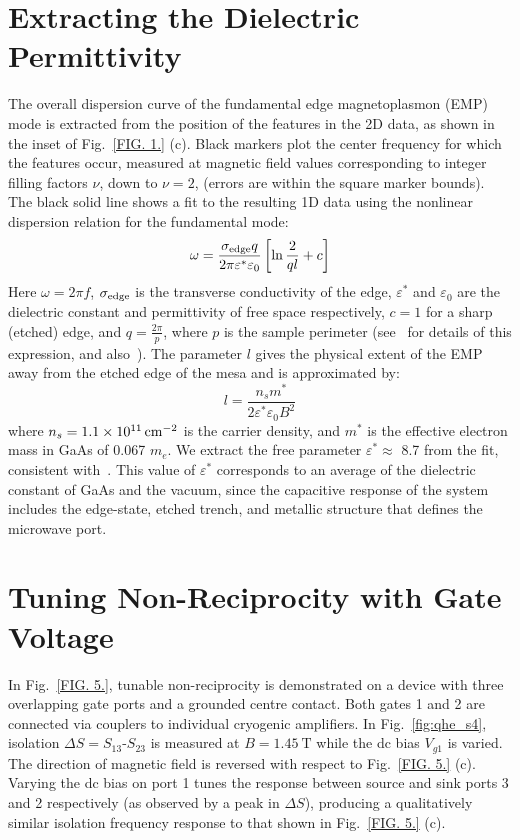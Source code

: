 \section{Extracting the Dielectric Permittivity}
\label{sec:qhe_di}
The overall dispersion curve of the fundamental edge magnetoplasmon (EMP) mode is extracted from the position of the features in the 2D data, as shown in the inset of Fig.~\ref{FIG. 1.} (c). Black markers plot the center frequency for which the features occur, measured at magnetic field values corresponding to integer filling factors $\nu$, down to $\nu = 2$, (errors are within the square marker bounds). The black solid line shows a fit to the resulting 1D data using the nonlinear dispersion relation for the fundamental mode:
\begin{equation}
 \omega  = \frac{{\sigma_{\rm{edge}} q}}{{2\pi {\varepsilon ^*}{\varepsilon _0}}}\left[ {\ln \frac{2}{{ql}} + c} \right]
\end{equation}
Here $\omega  = 2\pi f$, $\sigma_{\rm{edge}}$ is the transverse conductivity of the edge, ${{\varepsilon ^*}}$ and ${{\varepsilon _0}}$ are the dielectric constant and permittivity of free space respectively, $c = 1$ for a sharp (etched) edge, and $q = \tfrac{{2\pi }}{p}$, where $p$ is the sample perimeter (see~\cite{1988ZhETF..94..217V} for details of this expression, and also~\cite{petkovic2013carrier,kumada2014resonant,balaban1997observation}). The parameter $l$ gives the physical extent of the EMP away from the etched edge of the mesa and is approximated by:
\begin{equation}
 l = \frac{{{n_s}{m^*}}}{{2 {\varepsilon ^*}{\varepsilon _0}{B^2}}}
\end{equation}
where $n_s = \SI{1.1e11}{\per\square\centi\meter}$ is the carrier density, and ${{m^*}}$ is the effective electron mass in GaAs of 0.067 ${m_e}$. We extract the free parameter ${{\varepsilon ^*}} \approx$ 8.7 from the fit, consistent with~\cite{balaban1997observation}. This value of ${{\varepsilon ^*}}$ corresponds to an average of the dielectric constant of GaAs and the vacuum, since the capacitive response of the system includes the edge-state, etched trench, and metallic structure that defines the microwave port.

\section{Tuning Non-Reciprocity with Gate Voltage}
\label{sec:qhe_tune}
In Fig.~\ref{FIG. 5.}, tunable non-reciprocity is demonstrated on a device with three overlapping gate ports and a grounded centre contact. Both gates 1 and 2 are connected via couplers to individual cryogenic amplifiers. In Fig.~\ref{fig:qhe_s4}, isolation $\Delta S = S_{13}$-$S_{23}$ is measured at $B = \SI{1.45}{\tesla}$ while the dc bias $V_{g1}$ is varied. The direction of magnetic field is reversed with respect to Fig.~\ref{FIG. 5.} (c). Varying the dc bias on port 1 tunes the response between source and sink ports 3 and 2 respectively (as observed by a peak in $\Delta S$), producing a qualitatively similar isolation frequency response to that shown in Fig.~\ref{FIG. 5.} (c).

